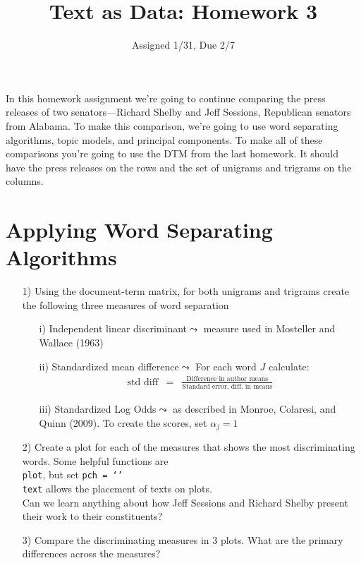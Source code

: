 \documentclass[12pt,letterpaper]{article}
\title{Text as Data: Homework 3}
\date{Assigned 1/31, Due 2/7}
\begin{document}
\maketitle


In this homework assignment we're going to continue comparing the press releases of two senators---Richard Shelby and Jeff Sessions, Republican senators from Alabama.  To make this comparison, we're going to use word separating algorithms, topic models, and principal components.  To make all of these comparisons you're going to use the DTM from the last homework.  It should have the press releases on the rows and the set of unigrams and trigrams on the columns.   



\section*{Applying Word Separating Algorithms}


\begin{itemize}
\item[1)] Using the document-term matrix, for both unigrams and trigrams create the following three measures of word separation
\begin{itemize}
\item[i)] Independent linear discriminant$\leadsto$ measure used in Mosteller and Wallace (1963) 
\item[ii)] Standardized mean difference$\leadsto$ For each word $J$ calculate:
\begin{eqnarray}
\text{std diff} & = &\frac{\text{Difference in author means}}{\text{Standard error, diff. in means}}\nonumber 
\end{eqnarray}
\item[iii)] Standardized Log Odds$\leadsto$ as described in Monroe, Colaresi, and Quinn (2009). To create the scores,  set $\alpha_{j} = 1$
\end{itemize}
\item[2)] Create a plot for each of the measures that shows the most discriminating words.  Some helpful functions are \\
{\tt plot}, but set {\tt pch = `'} \\
{\tt text}  allows the placement of texts on plots. \\
Can we learn anything about how Jeff Sessions and Richard Shelby present their work to their constituents?\\
\item[3)] Compare the discriminating measures in 3 plots.  What are the primary differences across the measures?
\end{itemize}
\end{document}
